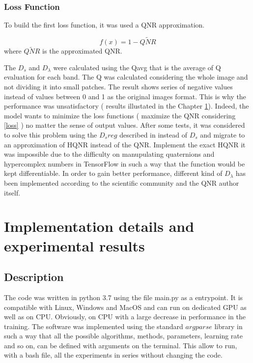 \documentclass[12pt]{report}
\begin{document}
\restoregeometry

\subsection{Loss Function}

To build the first loss function, it was used a QNR approximation. 

\begin{equation}
    f(x) = 1 - \widetilde{QNR}
    \label{loss}
\end{equation}
%
where $\widetilde{QNR}$ is the approximated QNR.

The $D_s$ and $D_\lambda$ were calculated using the Qavg that is the average of Q evaluation for each band. The Q was calculated considering the whole image and not
dividing it into small patches.
The result shows series of negative values instead of values between 0 and 1 as the original images format.
This is why the performance was unsatisfactory ( results illustated in the Chapter \ref{chap4}).
Indeed, the model wants to minimize the loss functions ( maximize the QNR considering \ref{loss} ) no matter 
the sense of output values.
After some tests, it was considered to solve this problem using the $D_sreg$ described in \cite{dsreg} instead of $D_s$  
and migrate to an approximation of HQNR instead of the QNR.
Implement the exact HQNR it was impossible due to the difficulty on manupulating quaternions and hypercomplex numbers in TensorFlow in such
a way that the function would be kept differentiable.
In order to gain better performance, different kind of $D_\lambda$ has been implemented according to the scientific community and the QNR author itself.

\chapter{Implementation details and experimental results}\label{chap4}
\section{Description}
The code was written in python 3.7 using the file main.py as a entrypoint. It is compatible with Linux, Windows and MacOS and can run on dedicated GPU as well as on CPU.
Obviously, on CPU with a large decrease in performance in the training.
The software was implemented using the standard $argparse$ library in such a way that all the possible algorithms, methods, parameters, learning rate and so on,
can be defined with arguments on the terminal.
This allow to run, with a bash file, all the experiments in series without changing the code.
\end{document}
